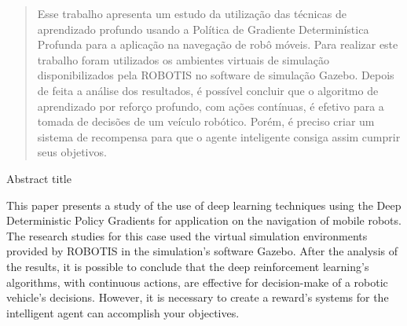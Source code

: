 \begin{abstract}
Esse trabalho apresenta um estudo da utilização das técnicas de aprendizado profundo usando a Política de Gradiente Determinística Profunda para a aplicação na navegação de robô móveis. 
Para realizar este trabalho foram utilizados os ambientes virtuais de simulação disponibilizados pela ROBOTIS no software de simulação Gazebo. 
Depois de feita a análise dos resultados, é possível concluir que o algoritmo de aprendizado por reforço profundo, com ações contínuas, é efetivo para a tomada de decisões de um veículo robótico. 
Porém, é preciso criar um sistema de recompensa para que o agente inteligente consiga assim cumprir seus objetivos.

\end{abstract}

\begin{englishabstract}
{Abstract title}
\ %
\ %
\ %

This paper presents a study of the use of deep learning techniques using the Deep Deterministic Policy Gradients for application on the navigation of mobile robots. 
The research studies for this case used the virtual simulation environments provided by ROBOTIS in the simulation’s software Gazebo.
After the analysis of the results, it is possible to conclude that the deep reinforcement learning’s algorithms, with continuous actions, are effective for decision-make of a robotic vehicle's decisions. 
However, it is necessary to create a reward’s systems for the intelligent agent can accomplish your objectives.

\end{englishabstract}
